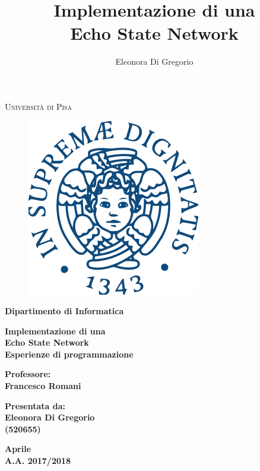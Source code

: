 \documentclass[12pt,titlepage]{report}
\title{Implementazione di una\\ Echo State Network}
\author{Eleonora Di Gregorio}
\begin{document}
\baselineskip 18pt

\begin{titlepage}
	\begin{center}
		{{\Large{\textsc{Universit\`a di Pisa\\}}}}
	\begin{figure}[h!]
		\centering 
		\includegraphics[width=0.3\linewidth]{immagini/Stemma_unipi.png}
	\end{figure}	
		{\bf Dipartimento di Informatica}
	\end{center}
	\vspace{12mm}
	\begin{center}
		{\LARGE{\bf Implementazione di una}}\\
		\vspace{3mm}
		{\LARGE{\bf Echo State Network}}\\
		\vspace{12mm} {\large{\bf Esperienze di programmazione}}
	\end{center}
	\vspace{12mm}
	\par
	\noindent
	\begin{minipage}[t]{0.47\textwidth}
		{\large{\bf Professore:\\
				Francesco Romani\\}}
	\end{minipage}
	\hfill
	\begin{minipage}[t]{0.47\textwidth}\raggedleft
		{\large{\bf Presentata da:\\
				Eleonora Di Gregorio \\
				(520655)}}
	\end{minipage}
	\vspace{20mm}
	\begin{center}
		{\large{\bf Aprile\\%
				A.A. 2017/2018 }}%
	\end{center}
\end{titlepage}
\end{document}
